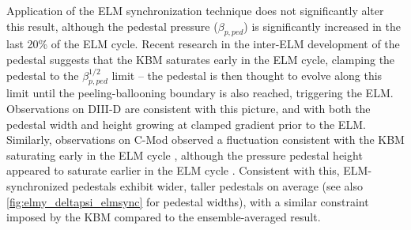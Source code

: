 \begin{figure}[t]
 \pushtooutside
\end{figure}

Application of the ELM synchronization technique does not significantly alter this result, although the pedestal pressure (\ie $\beta_{p,ped}$) is significantly increased in the last 20\% of the ELM cycle.  Recent research in the inter-ELM development of the pedestal suggests that the KBM saturates early in the ELM cycle, clamping the pedestal to the $\beta_{p,ped}^{1/2}$ limit -- the pedestal is then thought to evolve along this limit until the peeling-ballooning boundary is also reached, triggering the ELM.  Observations on DIII-D \cite{Snyder2012} are consistent with this picture, and with both the pedestal width and height growing at clamped gradient prior to the ELM.  Similarly, observations on C-Mod observed a fluctuation consistent with the KBM saturating early in the ELM cycle \cite{Diallo2014}, although the pressure pedestal height appeared to saturate earlier in the ELM cycle \cite{Hughes2013}.  Consistent with this, ELM-synchronized pedestals exhibit wider, taller pedestals on average (see also \cref{fig:elmy_deltapsi_elmsync} for pedestal widths), with a similar constraint imposed by the KBM compared to the ensemble-averaged result.  

